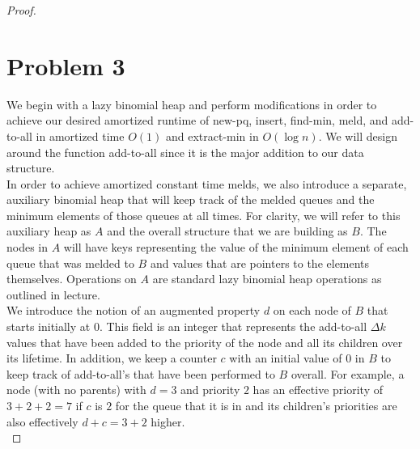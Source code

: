\documentclass{article}
\theoremstyle{casestyle}
\begin{document}
\begin{proof}


  \newpage


  \section *{Problem 3}

  We begin with a lazy binomial heap and perform modifications in order to achieve our desired  amortized runtime of new-pq, insert, find-min, meld, and add-to-all in amortized time $O(1)$ and extract-min in $O(\log n)$. We will design around the function add-to-all since it is the major addition to our data structure.\\

  In order to achieve amortized constant time melds, we also introduce a separate, auxiliary binomial heap that will keep track of the melded queues and the minimum elements of those queues at all times. For clarity, we will refer to this auxiliary heap as $A$ and the overall structure that we are building as $B$. The nodes in $A$ will have keys representing the value of the minimum element of each queue that was melded to $B$ and values that are pointers to the elements themselves. Operations on $A$ are standard lazy binomial heap operations as outlined in lecture.\\

  We introduce the notion of an augmented property $d$ on each node of $B$ that starts initially at $0$. This field is an integer that represents the add-to-all $\Delta k$ values that have been added to the priority of the node and all its children over its lifetime. In addition, we keep a counter $c$ with an initial value of 0 in $B$ to keep track of add-to-all's that have been performed to $B$ overall. For example, a node (with no parents) with $d=3$ and priority $2$ has an effective priority of $3+2+2=7$ if $c$ is $2$ for the queue that it is in and its children's priorities are also effectively $d+c=3+2$ higher. \\


\end{proof}
\end{document}
